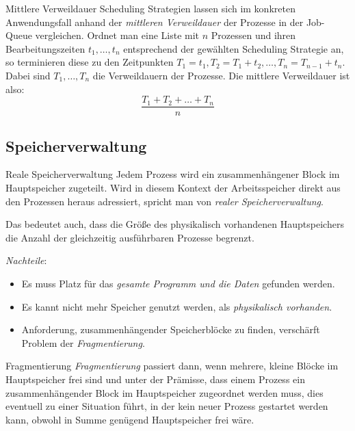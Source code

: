 \begin{bonus}{Mittlere Verweildauer}
	Scheduling Strategien lassen sich im konkreten Anwendungsfall anhand der \emph{mittleren Verweildauer} der Prozesse in der Job-Queue vergleichen. Ordnet man eine Liste mit $n$ Prozessen und ihren Bearbeitungszeiten $t_1, \ldots , t_n$ entsprechend der gewählten Scheduling Strategie an, so terminieren diese zu den Zeitpunkten $T_1 = t_1, T_2 = T_1 + t_2, \ldots , T_n = T_{n-1} + t_n$. Dabei sind $T_1, \ldots , T_n$ die Verweildauern der Prozesse. Die mittlere Verweildauer ist also:
	$$
		\frac{T_1 + T_2 + \ldots + T_n}{n}
	$$
\end{bonus}

\subsection{Speicherverwaltung}

\begin{defi}{Reale Speicherverwaltung}
    Jedem Prozess wird ein zusammenhängener Block im Hauptspeicher zugeteilt.
    Wird in diesem Kontext der Arbeitsspeicher direkt aus den Prozessen heraus adressiert, spricht man von \emph{realer Speicherverwaltung}.

    Das bedeutet auch, dass die Größe des physikalisch vorhandenen Hauptspeichers die Anzahl der gleichzeitig ausführbaren Prozesse begrenzt.

    \emph{Nachteile}:
    \begin{itemize}
        \item Es muss Platz für das \emph{gesamte Programm und die Daten} gefunden werden.
        \item Es kannt nicht mehr Speicher genutzt werden, als \emph{physikalisch vorhanden}.
        \item Anforderung, zusammenhängender Speicherblöcke zu finden, verschärft Problem der \emph{Fragmentierung}.
    \end{itemize}
\end{defi}

\begin{bonus}{Fragmentierung}
    \emph{Fragmentierung} passiert dann, wenn mehrere, kleine Blöcke im Hauptspeicher frei sind und unter der Prämisse, dass einem
    Prozess ein zusammenhängender Block im Hauptspeicher zugeordnet werden
    muss, dies eventuell zu einer Situation führt, in der kein neuer Prozess gestartet
    werden kann, obwohl in Summe genügend Hauptspeicher frei wäre.
\end{bonus}

